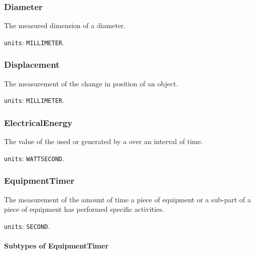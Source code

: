\subsubsection{Diameter}
\label{sec:Diameter}



The measured dimension of a diameter.


\texttt{units}: \texttt{MILLIMETER}.


\subsubsection{Displacement}
\label{sec:Displacement}



The measurement of the change in position of an object.


\texttt{units}: \texttt{MILLIMETER}.


\subsubsection{ElectricalEnergy}
\label{sec:ElectricalEnergy}



The value of the  used or generated by a  over an interval of time.


\texttt{units}: \texttt{WATT\textunderscore SECOND}.


\subsubsection{EquipmentTimer}
\label{sec:EquipmentTimer}



The measurement of the amount of time a piece of equipment or a sub-part of a piece of equipment has performed specific activities.


\texttt{units}: \texttt{SECOND}.

\paragraph{Subtypes of EquipmentTimer}\mbox{}
\label{sec:Subtypes of EquipmentTimer}

